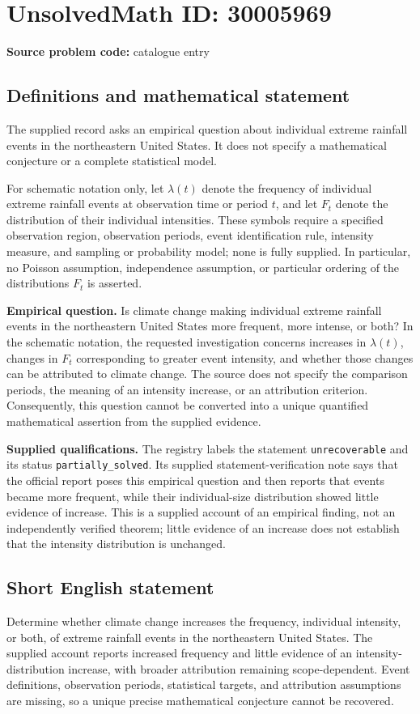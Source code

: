 \documentclass[11pt]{article}
\begin{document}
\section*{UnsolvedMath ID: 30005969}
\textbf{Source problem code:} catalogue entry
\subsection{Definitions and mathematical statement}
The supplied record asks an empirical question about individual extreme rainfall events in the northeastern United States. It does not specify a mathematical conjecture or a complete statistical model.

For schematic notation only, let \(\lambda(t)\) denote the frequency of individual extreme rainfall events at observation time or period \(t\), and let \(F_t\) denote the distribution of their individual intensities. These symbols require a specified observation region, observation periods, event identification rule, intensity measure, and sampling or probability model; none is fully supplied. In particular, no Poisson assumption, independence assumption, or particular ordering of the distributions \(F_t\) is asserted.

\textbf{Empirical question.} Is climate change making individual extreme rainfall events in the northeastern United States more frequent, more intense, or both? In the schematic notation, the requested investigation concerns increases in \(\lambda(t)\), changes in \(F_t\) corresponding to greater event intensity, and whether those changes can be attributed to climate change. The source does not specify the comparison periods, the meaning of an intensity increase, or an attribution criterion. Consequently, this question cannot be converted into a unique quantified mathematical assertion from the supplied evidence.

\textbf{Supplied qualifications.} The registry labels the statement \texttt{unrecoverable} and its status \texttt{partially\_solved}. Its supplied statement-verification note says that the official report poses this empirical question and then reports that events became more frequent, while their individual-size distribution showed little evidence of increase. This is a supplied account of an empirical finding, not an independently verified theorem; little evidence of an increase does not establish that the intensity distribution is unchanged.
\subsection{Short English statement}
Determine whether climate change increases the frequency, individual intensity, or both, of extreme rainfall events in the northeastern United States. The supplied account reports increased frequency and little evidence of an intensity-distribution increase, with broader attribution remaining scope-dependent. Event definitions, observation periods, statistical targets, and attribution assumptions are missing, so a unique precise mathematical conjecture cannot be recovered.
\end{document}
